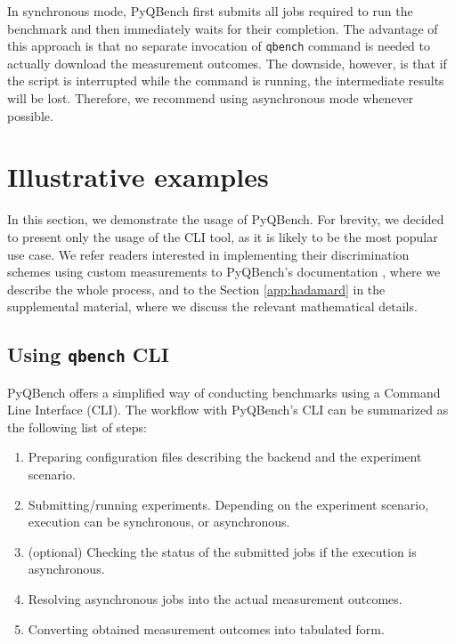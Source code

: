 \documentclass[preprint,12pt, a4paper, dvipsnames]{elsarticle}
\newcommand{\1}{{\rm 1\hspace{-0.9mm}l}}
\theoremstyle{definition}
\begin{document}
In synchronous mode, PyQBench first submits all jobs required to run the benchmark and then
immediately waits for their completion. The advantage of this approach is that no separate
invocation of \texttt{qbench} command is needed to actually download the measurement outcomes. The
downside, however, is that if the script is interrupted while the command is running, the
intermediate results will be lost. Therefore, we recommend using asynchronous mode whenever
possible.

\section{Illustrative examples}
\label{sec:examples} In this section, we demonstrate the usage of PyQBench.
For brevity, we decided to present only the usage of the CLI tool, as it is likely to be the most
popular use case. We refer readers interested in implementing their discrimination schemes using
custom measurements to PyQBench's documentation \cite{pyqbenchdocs}, where we describe the whole
process, and to the Section \ref{app:hadamard} in the supplemental material, where we discuss
the relevant mathematical details.

\subsection{Using \texttt{qbench} CLI}
PyQBench offers a simplified way of conducting benchmarks using a Command Line Interface (CLI).
The workflow with PyQBench's CLI can be summarized as the following list of steps:

\begin{enumerate}
  \item Preparing configuration files describing the backend and the experiment scenario.
  \item Submitting/running experiments. Depending on the experiment scenario, execution can be
		synchronous, or asynchronous.
  \item (optional) Checking the status of the submitted jobs if the execution is asynchronous.
  \item Resolving asynchronous jobs into the actual measurement outcomes.
  \item Converting obtained measurement outcomes into tabulated form.
\end{enumerate}
\end{document}

